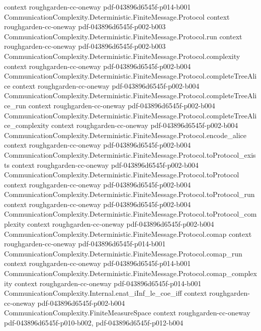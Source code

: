 \begin{theorem}
  {context}
  {roughgarden-cc-oneway}
  {pdf-043896d6545f-p014-b001}
\proofstep
  {CommunicationComplexity.Deterministic.FiniteMessage.Protocol}
  {context}
  {roughgarden-cc-oneway}
  {pdf-043896d6545f-p002-b003}
\proofstep
  {CommunicationComplexity.Deterministic.FiniteMessage.Protocol.run}
  {context}
  {roughgarden-cc-oneway}
  {pdf-043896d6545f-p002-b003}
\proofstep
  {CommunicationComplexity.Deterministic.FiniteMessage.Protocol.complexity}
  {context}
  {roughgarden-cc-oneway}
  {pdf-043896d6545f-p002-b004}
\proofstep
  {CommunicationComplexity.Deterministic.FiniteMessage.Protocol.completeTreeAlice}
  {context}
  {roughgarden-cc-oneway}
  {pdf-043896d6545f-p002-b004}
\proofstep
  {CommunicationComplexity.Deterministic.FiniteMessage.Protocol.completeTreeAlice_run}
  {context}
  {roughgarden-cc-oneway}
  {pdf-043896d6545f-p002-b004}
\proofstep
  {CommunicationComplexity.Deterministic.FiniteMessage.Protocol.completeTreeAlice_complexity}
  {context}
  {roughgarden-cc-oneway}
  {pdf-043896d6545f-p002-b004}
\proofstep
  {CommunicationComplexity.Deterministic.FiniteMessage.Protocol.encode_alice}
  {context}
  {roughgarden-cc-oneway}
  {pdf-043896d6545f-p002-b004}
\proofstep
  {CommunicationComplexity.Deterministic.FiniteMessage.Protocol.toProtocol_exists}
  {context}
  {roughgarden-cc-oneway}
  {pdf-043896d6545f-p002-b004}
\proofstep
  {CommunicationComplexity.Deterministic.FiniteMessage.Protocol.toProtocol}
  {context}
  {roughgarden-cc-oneway}
  {pdf-043896d6545f-p002-b004}
\proofstep
  {CommunicationComplexity.Deterministic.FiniteMessage.Protocol.toProtocol_run}
  {context}
  {roughgarden-cc-oneway}
  {pdf-043896d6545f-p002-b004}
\proofstep
  {CommunicationComplexity.Deterministic.FiniteMessage.Protocol.toProtocol_complexity}
  {context}
  {roughgarden-cc-oneway}
  {pdf-043896d6545f-p002-b004}
\proofstep
  {CommunicationComplexity.Deterministic.FiniteMessage.Protocol.comap}
  {context}
  {roughgarden-cc-oneway}
  {pdf-043896d6545f-p014-b001}
\proofstep
  {CommunicationComplexity.Deterministic.FiniteMessage.Protocol.comap_run}
  {context}
  {roughgarden-cc-oneway}
  {pdf-043896d6545f-p014-b001}
\proofstep
  {CommunicationComplexity.Deterministic.FiniteMessage.Protocol.comap_complexity}
  {context}
  {roughgarden-cc-oneway}
  {pdf-043896d6545f-p014-b001}
\proofstep
  {CommunicationComplexity.Internal.enat_iInf_le_coe_iff}
  {context}
  {roughgarden-cc-oneway}
  {pdf-043896d6545f-p002-b004}
\proofstep
  {CommunicationComplexity.FiniteMeasureSpace}
  {context}
  {roughgarden-cc-oneway}
  {pdf-043896d6545f-p010-b002,
    pdf-043896d6545f-p012-b004}
\proofstep

\end{theorem}
